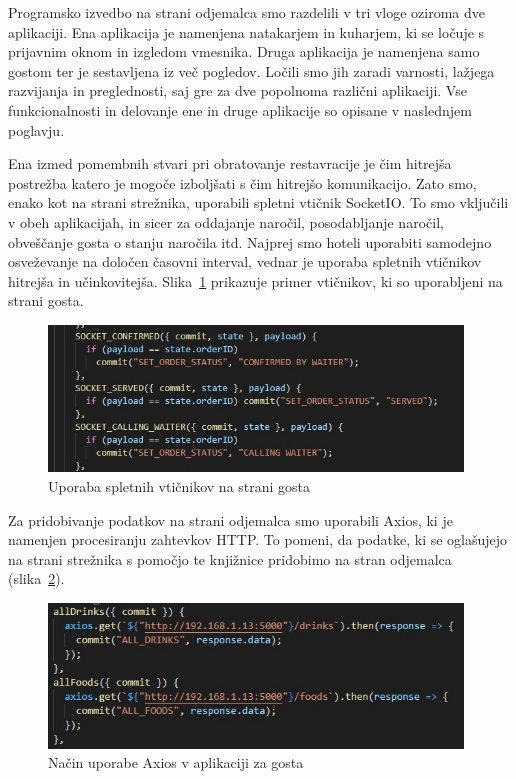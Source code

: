 \documentclass[a4paper, 12pt]{book}
\begin{document}
Programsko izvedbo na strani odjemalca smo razdelili v tri vloge oziroma dve aplikaciji. Ena aplikacija je namenjena natakarjem in kuharjem, ki se ločuje s prijavnim oknom in izgledom vmesnika. Druga aplikacija je namenjena samo gostom ter je sestavljena iz več pogledov. Ločili smo jih zaradi varnosti, lažjega razvijanja in preglednosti, saj gre za dve popolnoma različni aplikaciji. Vse funkcionalnosti in delovanje ene in druge aplikacije so opisane v naslednjem poglavju.

Ena izmed pomembnih stvari pri obratovanje restavracije je čim hitrejša postrežba katero je mogoče izboljšati s čim hitrejšo komunikacijo. Zato smo, enako kot na strani strežnika, uporabili spletni vtičnik SocketIO. To smo vključili v obeh aplikacijah, in sicer za oddajanje naročil, posodabljanje naročil, obveščanje gosta o stanju naročila itd. Najprej smo hoteli uporabiti samodejno osveževanje na določen časovni interval, vednar je uporaba spletnih vtičnikov hitrejša in učinkovitejša. Slika~\ref{socketioo1} prikazuje primer vtičnikov, ki so uporabljeni na strani gosta.

\begin{figure}[!htb]
\begin{center}
\includegraphics[width=11cm]{socketio_2.jpg}
\caption{Uporaba spletnih vtičnikov na strani gosta}
\label{socketioo1}
\end{center}
\end{figure}

Za pridobivanje podatkov na strani odjemalca smo uporabili Axios, ki je namenjen procesiranju zahtevkov  HTTP. To pomeni, da podatke, ki se oglašujejo na strani strežnika s pomočjo te knjižnice pridobimo na stran odjemalca (slika~\ref{axios_1}). 

\begin{figure}[!htb]
\begin{center}
\includegraphics[width=11cm]{axios_1.jpg}
\caption{Način uporabe Axios v aplikaciji za gosta}
\label{axios_1}
\end{center}
\end{figure}
\end{document}
